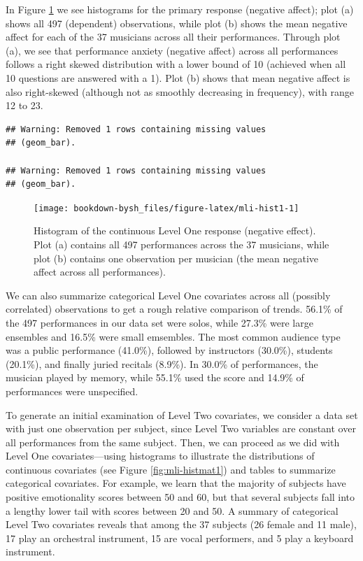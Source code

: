\documentclass[
]{krantz}
\begin{document}
In Figure \ref{fig:mli-hist1} we see histograms for the primary response (negative affect); plot (a) shows all 497 (dependent) observations, while plot (b) shows the mean negative affect for each of the 37 musicians across all their performances. Through plot (a), we see that performance anxiety (negative affect) across all performances follows a right skewed distribution with a lower bound of 10 (achieved when all 10 questions are answered with a 1). Plot (b) shows that mean negative affect is also right-skewed (although not as smoothly decreasing in frequency), with range 12 to 23.

\begin{verbatim}
## Warning: Removed 1 rows containing missing values
## (geom_bar).

## Warning: Removed 1 rows containing missing values
## (geom_bar).
\end{verbatim}

\begin{figure}

{\centering \texttt{[image: bookdown-bysh\_files/figure-latex/mli-hist1-1]} 

}

\caption{Histogram of the continuous Level One response (negative effect). Plot (a) contains all 497 performances across the 37 musicians, while plot (b) contains one observation per musician (the mean negative affect across all performances).}\label{fig:mli-hist1}
\end{figure}

We can also summarize categorical Level One covariates across all (possibly correlated) observations to get a rough relative comparison of trends. 56.1\% of the 497 performances in our data set were solos, while 27.3\% were large ensembles and 16.5\% were small emsembles. The most common audience type was a public performance (41.0\%), followed by instructors (30.0\%), students (20.1\%), and finally juried recitals (8.9\%). In 30.0\% of performances, the musician played by memory, while 55.1\% used the score and 14.9\% of performances were unspecified.

To generate an initial examination of Level Two covariates, we consider a data set with just one observation per subject, since Level Two variables are constant over all performances from the same subject. Then, we can proceed as we did with Level One covariates---using histograms to illustrate the distributions of continuous covariates (see Figure \ref{fig:mli-histmat1}) and tables to summarize categorical covariates. For example, we learn that the majority of subjects have positive emotionality scores between 50 and 60, but that several subjects fall into a lengthy lower tail with scores between 20 and 50. A summary of categorical Level Two covariates reveals that among the 37 subjects (26 female and 11 male), 17 play an orchestral instrument, 15 are vocal performers, and 5 play a keyboard instrument.
\end{document}
